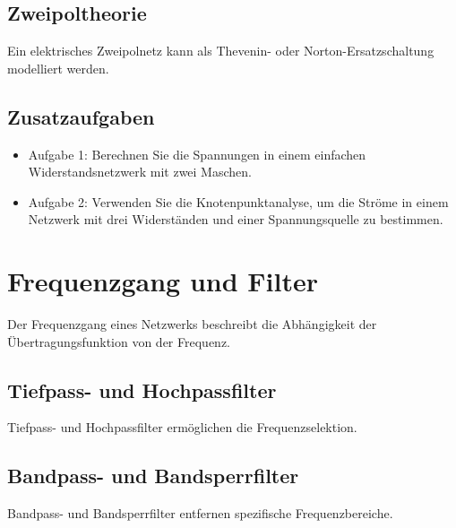 \documentclass[11pt,a4paper]{article}
\begin{document}




\subsection{Zweipoltheorie}
Ein elektrisches Zweipolnetz kann als Thevenin- oder Norton-Ersatzschaltung modelliert werden.



\subsection{Zusatzaufgaben}
\begin{itemize}
	\item Aufgabe 1: Berechnen Sie die Spannungen in einem einfachen Widerstandsnetzwerk mit zwei Maschen.
	\item Aufgabe 2: Verwenden Sie die Knotenpunktanalyse, um die Ströme in einem Netzwerk mit drei Widerständen und einer Spannungsquelle zu bestimmen.
\end{itemize}



\vspace{1cm}
\section{Frequenzgang und Filter}
Der Frequenzgang eines Netzwerks beschreibt die Abhängigkeit der Übertragungsfunktion von der Frequenz.


\subsection{Tiefpass- und Hochpassfilter}
Tiefpass- und Hochpassfilter ermöglichen die Frequenzselektion.

\subsection{Bandpass- und Bandsperrfilter}
Bandpass- und Bandsperrfilter entfernen spezifische Frequenzbereiche.
\end{document}
